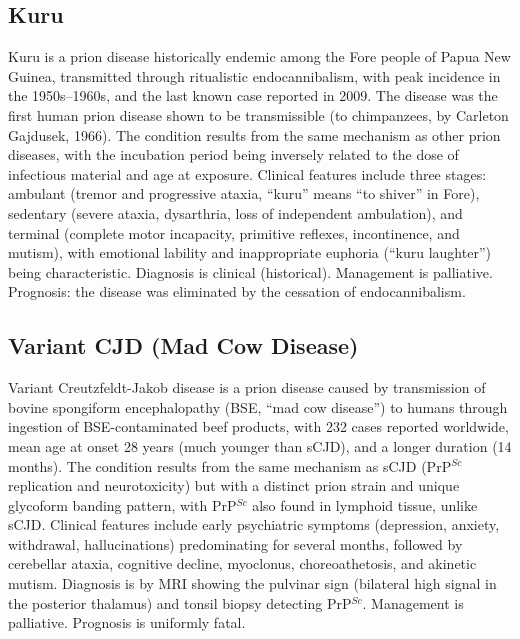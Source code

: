 \subsection{Kuru}
\label{sec:Kuru}
Kuru is a prion disease historically endemic among the Fore people of Papua New Guinea, transmitted through ritualistic endocannibalism, with peak incidence in the 1950s--1960s, and the last known case reported in 2009. The disease was the first human prion disease shown to be transmissible (to chimpanzees, by Carleton Gajdusek, 1966). The condition results from the same mechanism as other prion diseases, with the incubation period being inversely related to the dose of infectious material and age at exposure. Clinical features include three stages: ambulant (tremor and progressive ataxia, ``kuru'' means ``to shiver'' in Fore), sedentary (severe ataxia, dysarthria, loss of independent ambulation), and terminal (complete motor incapacity, primitive reflexes, incontinence, and mutism), with emotional lability and inappropriate euphoria (``kuru laughter'') being characteristic. Diagnosis is clinical (historical). Management is palliative. Prognosis: the disease was eliminated by the cessation of endocannibalism.

\subsection{Variant CJD (Mad Cow Disease)}
\label{sec:Variant CJD}
Variant Creutzfeldt-Jakob disease is a prion disease caused by transmission of bovine spongiform encephalopathy (BSE, ``mad cow disease'') to humans through ingestion of BSE-contaminated beef products, with 232 cases reported worldwide, mean age at onset 28 years (much younger than sCJD), and a longer duration (14 months). The condition results from the same mechanism as sCJD (PrP$^{Sc}$ replication and neurotoxicity) but with a distinct prion strain and unique glycoform banding pattern, with PrP$^{Sc}$ also found in lymphoid tissue, unlike sCJD. Clinical features include early psychiatric symptoms (depression, anxiety, withdrawal, hallucinations) predominating for several months, followed by cerebellar ataxia, cognitive decline, myoclonus, choreoathetosis, and akinetic mutism. Diagnosis is by MRI showing the pulvinar sign (bilateral high signal in the posterior thalamus) and tonsil biopsy detecting PrP$^{Sc}$. Management is palliative. Prognosis is uniformly fatal.

